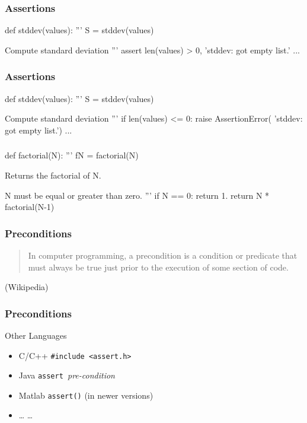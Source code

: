 \begin{frame}[fragile]
\frametitle{Assertions}
\begin{python}
def stddev(values):
    '''
    S = stddev(values)

    Compute standard deviation
    '''
    assert len(values) > 0, 'stddev: got empty list.'
    ...
\end{python}
\end{frame}

\begin{frame}[fragile]
\frametitle{Assertions}

\begin{python}
def stddev(values):
    '''
    S = stddev(values)

    Compute standard deviation
    '''
    if len(values) <= 0:
        raise AssertionError(
            'stddev: got empty list.')
    ...
\end{python}

\end{frame}

\begin{frame}[fragile]
\frametitle{}

\begin{python}
def factorial(N):
    '''
    fN = factorial(N)

    Returns the factorial of N.

    N must be equal or greater than zero.
    '''
    if N == 0:
        return 1.
    return N * factorial(N-1)
\end{python}
\end{frame}

\begin{frame}[fragile]
\frametitle{Preconditions}

\begin{quote}
In computer programming, a precondition is a condition or predicate that must always be true just prior to the execution of some section of code.
\end{quote}

\begin{flushright}
(Wikipedia)
\end{flushright}

\end{frame}

\begin{frame}[fragile]
\frametitle{Preconditions}
\begin{block}{Other Languages}
\begin{itemize}
\item \alert{C/C++} \lstinline{#include <assert.h>}
\item \alert{Java} \lstinline{assert }\textit{pre-condition}
\item \alert{Matlab} \lstinline{assert()} (in newer versions)
\item \alert{\ldots} \ldots
\end{itemize}
\end{block}
\end{frame}

